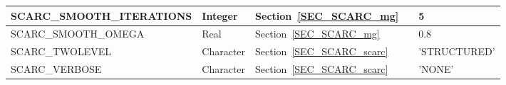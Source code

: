 \begin{longtable}{@{\extracolsep{\fill}}|l|l|l|l|l|}
{\ct SCARC\_SMOOTH\_ITERATIONS}    & Integer           & Section~\ref{SEC_SCARC_mg}  & &  5                   \\ \hline
{\ct SCARC\_SMOOTH\_OMEGA}           & Real               & Section~\ref{SEC_SCARC_mg}  & &  0.8                 \\ \hline
{\ct SCARC\_TWOLEVEL}                        & Character         & Section~\ref{SEC_SCARC_scarc}  & &  {\ct 'STRUCTURED'}  \\ \hline
{\ct SCARC\_VERBOSE}                          & Character         & Section~\ref{SEC_SCARC_scarc}  & &  {\ct 'NONE'}        \\ \hline

\end{longtable}


